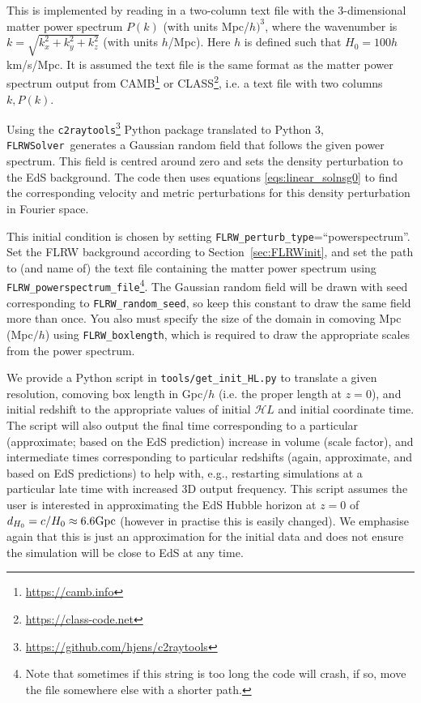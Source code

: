 This is implemented by reading in a two-column text file with the 3-dimensional matter power spectrum $P(k)$ (with units Mpc/$h)^3$, where the wavenumber is $k=\sqrt{k_x^2+k_y^2+k_z^2}$ (with units $h$/Mpc). Here $h$ is defined such that $H_0 = 100 h$km/s/Mpc. It is assumed the text file is the same format as the matter power spectrum output from CAMB\footnote{\url{https://camb.info}} or CLASS\footnote{\url{https://class-code.net}}, i.e. a text file with two columns $k, P(k)$.

Using the \texttt{c2raytools}\footnote{\url{https://github.com/hjens/c2raytools}} Python package translated to Python 3, \texttt{FLRWSolver}\ generates a Gaussian random field that follows the given power spectrum. This field is centred around zero and sets the density perturbation to the EdS background. The code then uses equations \eqref{eqs:linear_solnsg0} to find the corresponding velocity and metric perturbations for this density perturbation in Fourier space.

This initial condition is chosen by setting \texttt{FLRW\_perturb\_type}=``powerspectrum''. Set the FLRW background according to Section~\ref{sec:FLRWinit}, and set the path to (and name of) the text file containing the matter power spectrum using \texttt{FLRW\_powerspectrum\_file}\footnote{Note that sometimes if this string is too long the code will crash, if so, move the file somewhere else with a shorter path.}. The Gaussian random field will be drawn with seed corresponding to \texttt{FLRW\_random\_seed}, so keep this constant to draw the same field more than once. You also must specify the size of the domain in comoving Mpc (Mpc$/h$) using \texttt{FLRW\_boxlength}, which is required to draw the appropriate scales from the power spectrum.

We provide a Python script in \texttt{tools/get\_init\_HL.py} to translate a given resolution, comoving box length in Gpc$/h$ (i.e. the proper length at $z=0$), and initial redshift to the appropriate values of initial $\mathcal{H}L$ and initial coordinate time. The script will also output the final time corresponding to a particular (approximate; based on the EdS prediction) increase in volume (scale factor), and intermediate times corresponding to particular redshifts (again, approximate, and based on EdS predictions) to help with, e.g., restarting simulations at a particular late time with increased 3D output frequency. This script assumes the user is interested in approximating the EdS Hubble horizon at $z=0$ of $d_{H_0}=c/H_0\approx 6.6{\rm Gpc}$ (however in practise this is easily changed). We emphasise again that this is just an approximation for the initial data and does not ensure the simulation will be close to EdS at any time.



